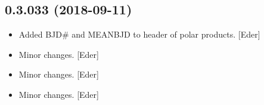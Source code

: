 \documentclass[a4paper,10pt,english]{report}
\begin{document}
\subsection{0.3.033 (2018-09-11)}
\label{\detokenize{misc/changelog:id328}}\begin{itemize}
\item {} 
Added BJD\# and MEANBJD to header of polar products. {[}Eder{]}

\item {} 
Minor changes. {[}Eder{]}

\item {} 
Minor changes. {[}Eder{]}

\item {} 
Minor changes. {[}Eder{]}

\end{itemize}
\end{document}
